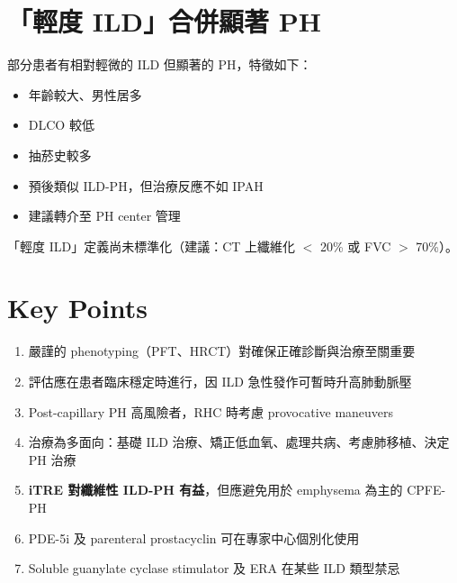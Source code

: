 \documentclass[11pt,a4paper]{article}
\begin{document}

\section{「輕度 ILD」合併顯著 PH}

部分患者有相對輕微的 ILD 但顯著的 PH，特徵如下：

\begin{itemize}
    \item 年齡較大、男性居多
    \item DLCO 較低
    \item 抽菸史較多
    \item 預後類似 ILD-PH，但治療反應不如 IPAH
    \item 建議轉介至 PH center 管理
\end{itemize}

「輕度 ILD」定義尚未標準化（建議：CT 上纖維化 $<$ 20\% 或 FVC $>$ 70\%）。

\section{Key Points}

\begin{enumerate}
    \item 嚴謹的 phenotyping（PFT、HRCT）對確保正確診斷與治療至關重要
    \item 評估應在患者臨床穩定時進行，因 ILD 急性發作可暫時升高肺動脈壓
    \item Post-capillary PH 高風險者，RHC 時考慮 provocative maneuvers
    \item 治療為多面向：基礎 ILD 治療、矯正低血氧、處理共病、考慮肺移植、決定 PH 治療
    \item \textbf{iTRE 對纖維性 ILD-PH 有益}，但應避免用於 emphysema 為主的 CPFE-PH
    \item PDE-5i 及 parenteral prostacyclin 可在專家中心個別化使用
    \item Soluble guanylate cyclase stimulator 及 ERA 在某些 ILD 類型禁忌
\end{enumerate}

\end{document}
